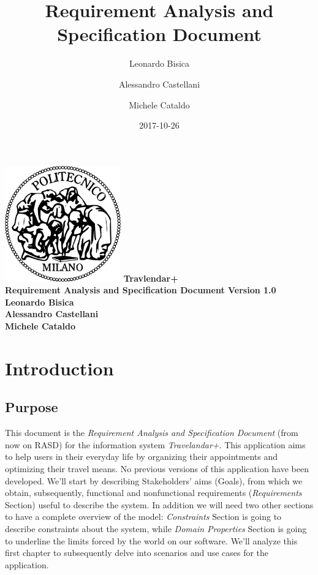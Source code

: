 \documentclass[12pt, a4paper]{article}
\title{Requirement Analysis and Specification Document}
\date{2017-10-26}
\author{
	Leonardo Bisica
	\and
	Alessandro Castellani
	\and
	Michele Cataldo
}
\begin{document}
	\begin{titlepage}
		\centering
		\includegraphics[width=5cm]{img/polimi_logo}
		\vfill
		{\bfseries\Large
			Travlendar+\\
			Requirement Analysis and Specification Document
			Version 1.0\\
			\vskip4cm
			Leonardo Bisica\\
			Alessandro Castellani\\
			Michele Cataldo\\
		}
		\vfill
		\vfill
	\end{titlepage}

	\tableofcontents
	
	
	
	\newpage
	\section{Introduction}
		\subsection{Purpose}
		
		This document is the \textit{Requirement Analysis and Specification Document} (from now on RASD) for the information system \textit{Travelandar+}.
		This application aims to help users in their everyday life by organizing their appointments and optimizing their travel means.
		No previous versions of this application have been developed. 
		We’ll start by describing Stakeholders’ aims (Goals), from which we obtain, subsequently, functional and nonfunctional requirements (\textit{Requirements} Section) useful to describe the system.
		In addition we will need two other sections to have a complete overview of the model: \textit{Constraints} Section is going to describe constraints about the system, while \textit{Domain Properties} Section is going to underline the limits forced by the world on our software.
		We'll analyze this first chapter to subsequently delve into scenarios and use cases for the application.
		
\end{document}
